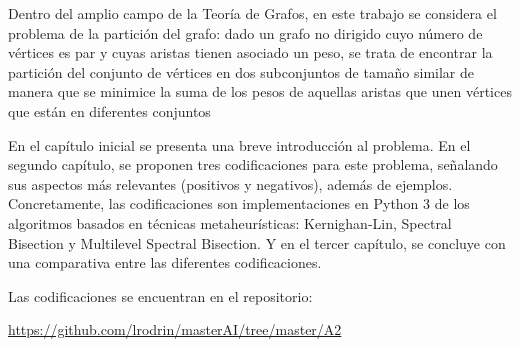 Dentro del amplio campo de la Teoría de Grafos, en este trabajo se considera el problema de la partición del grafo: dado un grafo no dirigido cuyo número de vértices es par y cuyas aristas tienen asociado un peso, se trata de encontrar la partición del conjunto de vértices en dos subconjuntos de tamaño similar de manera que se minimice la suma de los pesos de aquellas aristas que unen vértices que están en diferentes conjuntos

En el capítulo inicial se presenta una breve introducción al problema. En el segundo capítulo, se proponen tres codificaciones para este problema, señalando sus aspectos más relevantes (positivos y negativos), además de ejemplos. Concretamente, las codificaciones son implementaciones en Python 3 de los algoritmos basados en técnicas metaheurísticas: Kernighan-Lin, Spectral Bisection y Multilevel Spectral Bisection. Y en el tercer capítulo, se concluye con una comparativa entre las diferentes codificaciones.

Las codificaciones se encuentran en el repositorio:

\begin{center}
	\url{https://github.com/lrodrin/masterAI/tree/master/A2}\label{GitHub}
\end{center}
